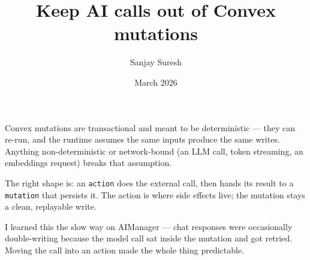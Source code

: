 \documentclass[11pt]{article}
\title{\textbf{Keep AI calls out of Convex mutations}}
\author{Sanjay Suresh}
\date{March 2026}
\begin{document}
\maketitle

Convex mutations are transactional and meant to be deterministic --- they can re-run, and the
runtime assumes the same inputs produce the same writes. Anything non-deterministic or network-bound
(an LLM call, token streaming, an embeddings request) breaks that assumption.

The right shape is: an \texttt{action} does the external call, then hands its result to a
\texttt{mutation} that persists it. The action is where side effects live; the mutation stays a
clean, replayable write.

I learned this the slow way on AIManager --- chat responses were occasionally double-writing because
the model call sat inside the mutation and got retried. Moving the call into an action made the whole
thing predictable.
\end{document}
